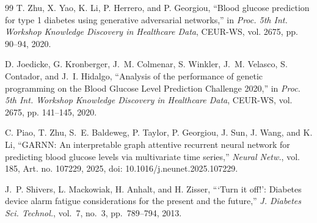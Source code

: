 \documentclass[journal]{IEEEtran}
\begin{document}
\begin{thebibliography}{99}
\label{ref65label} T. Zhu, X. Yao, K. Li, P. Herrero, and P. Georgiou, ``Blood glucose prediction for type 1 diabetes using generative adversarial networks,'' in \emph{Proc. 5th Int. Workshop Knowledge Discovery in Healthcare Data}, CEUR-WS, vol. 2675, pp. 90--94, 2020.

\label{ref70label} D. Joedicke, G. Kronberger, J.~M. Colmenar, S. Winkler, J.~M. Velasco, S. Contador, and J.~I. Hidalgo, ``Analysis of the performance of genetic programming on the Blood Glucose Level Prediction Challenge 2020,'' in \emph{Proc. 5th Int. Workshop Knowledge Discovery in Healthcare Data}, CEUR-WS, vol. 2675, pp. 141--145, 2020.

\label{ref75label} C. Piao, T. Zhu, S.~E. Baldeweg, P. Taylor, P. Georgiou, J. Sun, J. Wang, and K. Li, ``GARNN: An interpretable graph attentive recurrent neural network for predicting blood glucose levels via multivariate time series,'' \emph{Neural Netw.}, vol. 185, Art. no. 107229, 2025, doi: 10.1016/j.neunet.2025.107229.

\label{refShiverslabel} J.~P. Shivers, L. Mackowiak, H. Anhalt, and H. Zisser, ```Turn it off!': Diabetes device alarm fatigue considerations for the present and the future,'' \emph{J. Diabetes Sci. Technol.}, vol.~7, no.~3, pp.~789--794, 2013.

\end{thebibliography}
\end{document}
